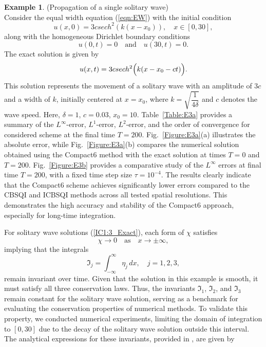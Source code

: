 \documentclass[11pt,a4paper]{amsart}
\theoremstyle{plain}
\theoremstyle{definition}
\newtheorem{example}[theorem]{Example}
\theoremstyle{remark}
\numberwithin{equation}{section}
\begin{document}
\begin{example}\label{example:3}
\normalfont
(Propagation of a single solitary wave) \\
Consider the equal width equation (\ref{eqn:EW}) with the initial condition
\begin{equation}\label{IC1:3}
    u(x,0) = 3c sech^2(k(x-x_0)), \quad x \in [0,30],
\end{equation}
along with the homogeneous Dirichlet boundary conditions
\begin{equation}
    u(0,t) = 0 \quad \text{and} \quad u(30,t) = 0.
\end{equation}
 The exact solution is given by 
\begin{equation}\label{IC1:3_Exact}
    u(x,t) = 3c sech^2\Bigl(k(x-x_0-ct)\Bigr).
\end{equation}
This solution represents the movement of a solitary wave with an amplitude of $3c$ and a width of $k$, initially centered at $x=x_0$, where $k=\sqrt{\dfrac{1}{4\delta}}$ and $c$ denotes the wave speed. Here, $\delta = 1$, $c=0.03$, $x_0 = 10$. Table~\ref{Table:E3a} provides a summary of the $L^{\infty}$-error, $L^{1}$-error, $L^{2}$-error, and the order of convergence for considered scheme at the final time $T = 200$. Fig.~\ref{Figure:E3a}(a) illustrates the absolute error, while Fig.~\ref{Figure:E3a}(b) compares the numerical solution obtained using the Compact6 method with the exact solution at times $T = 0$ and $T = 200$. %
Fig.~\ref{Figure:E3b} provides a comparative study of the $L^{\infty}$ errors at final time \( T = 200 \), with a fixed time step size \( \tau = 10^{-4} \). The results clearly indicate that the Compact6 scheme achieves significantly lower errors compared to the CBSQI and ICBSQI methods across all tested spatial resolutions. This demonstrates the high accuracy and stability of the Compact6 approach, especially for long-time integration.
\par
For solitary wave solutions (\ref{IC1:3_Exact}), each form of $\chi$ satisfies
\begin{equation}\label{Invariant:condition}
    \chi \to 0 \quad \text{as} \quad x \to \pm \infty,
\end{equation}
implying that the integrals
\begin{equation}
    \mathfrak{I}_j = \int_{-\infty}^{\infty} \eta_j \, dx, \quad j = 1, 2, 3,
\end{equation}
remain invariant over time. Given that the solution in this example is smooth, it must satisfy all three conservation laws. Thus, the invariants $\mathfrak{I}_1$, $\mathfrak{I}_2$, and $\mathfrak{I}_3$ remain constant for the solitary wave solution, serving as a benchmark for evaluating the conservation properties of numerical methods. To validate this property, we conducted numerical experiments, limiting the domain of integration to $[0, 30]$ due to the decay of the solitary wave solution outside this interval. The analytical expressions for these invariants, provided in \cite{gardner1997simulations}, are given by

\end{example}
\end{document}
